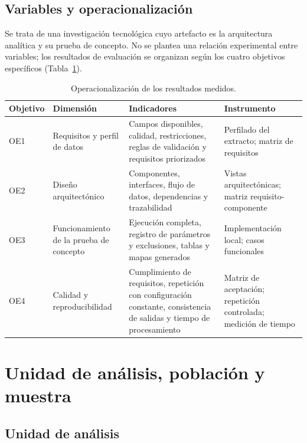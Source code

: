 \subsection{Variables y operacionalización}

Se trata de una investigación tecnológica cuyo artefacto es la arquitectura analítica y su prueba de concepto. No se plantea una relación experimental entre variables; los resultados de evaluación se organizan según los cuatro objetivos específicos (Tabla~\ref{tab:operacionalizacion}).

\begin{table}[H]
\centering
\caption{Operacionalización de los resultados medidos.}
\label{tab:operacionalizacion}
\begingroup\singlespacing\footnotesize
\begin{tabular}{@{}p{2.5cm}p{2.6cm}p{5.4cm}p{2.9cm}@{}}
\toprule
\textbf{Objetivo} & \textbf{Dimensión} & \textbf{Indicadores} & \textbf{Instrumento} \\
\midrule
OE1 & Requisitos y perfil de datos & Campos disponibles, calidad, restricciones, reglas de validación y requisitos priorizados & Perfilado del extracto; matriz de requisitos \\
\addlinespace
OE2 & Diseño arquitectónico & Componentes, interfaces, flujo de datos, dependencias y trazabilidad & Vistas arquitectónicas; matriz requisito-componente \\
\addlinespace
OE3 & Funcionamiento de la prueba de concepto & Ejecución completa, registro de parámetros y exclusiones, tablas y mapas generados & Implementación local; casos funcionales \\
\addlinespace
OE4 & Calidad y reproducibilidad & Cumplimiento de requisitos, repetición con configuración constante, consistencia de salidas y tiempo de procesamiento & Matriz de aceptación; repetición controlada; medición de tiempo \\
\bottomrule
\end{tabular}
\endgroup
{}
\end{table}

\section{Unidad de análisis, población y muestra}

\subsection{Unidad de análisis}

